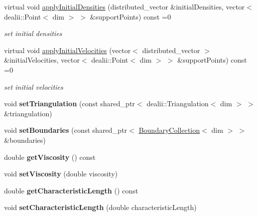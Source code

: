 \begin{DoxyCompactItemize}
\item 
virtual void \hyperlink{classnatrium_1_1ProblemDescription_ab4ccefafd2888510038259445076fed6}{apply\-Initial\-Densities} (distributed\-\_\-vector \&initial\-Densities, vector$<$ dealii\-::\-Point$<$ dim $>$ $>$ \&support\-Points) const =0
\begin{DoxyCompactList}\small\item\em set initial densities \end{DoxyCompactList}\item 
virtual void \hyperlink{classnatrium_1_1ProblemDescription_a28306325c69e7d2086a3dd7f8c514b21}{apply\-Initial\-Velocities} (vector$<$ distributed\-\_\-vector $>$ \&initial\-Velocities, vector$<$ dealii\-::\-Point$<$ dim $>$ $>$ \&support\-Points) const =0
\begin{DoxyCompactList}\small\item\em set initial velocities \end{DoxyCompactList}\item 
\hypertarget{classnatrium_1_1ProblemDescription_ae588b1e0ce4dd89e2fcfbb0c191b1c41}{void {\bfseries set\-Triangulation} (const shared\-\_\-ptr$<$ dealii\-::\-Triangulation$<$ dim $>$ $>$ \&triangulation)}\label{classnatrium_1_1ProblemDescription_ae588b1e0ce4dd89e2fcfbb0c191b1c41}

\item 
\hypertarget{classnatrium_1_1ProblemDescription_aadca2aac3953fa44bf9ce9cf43dc0417}{void {\bfseries set\-Boundaries} (const shared\-\_\-ptr$<$ \hyperlink{classnatrium_1_1BoundaryCollection}{Boundary\-Collection}$<$ dim $>$ $>$ \&boundaries)}\label{classnatrium_1_1ProblemDescription_aadca2aac3953fa44bf9ce9cf43dc0417}

\item 
\hypertarget{classnatrium_1_1ProblemDescription_a582ecf296837d78a8a00fd598de38de2}{double {\bfseries get\-Viscosity} () const }\label{classnatrium_1_1ProblemDescription_a582ecf296837d78a8a00fd598de38de2}

\item 
\hypertarget{classnatrium_1_1ProblemDescription_ad624cab941ab79af0422e5f7c735e8d8}{void {\bfseries set\-Viscosity} (double viscosity)}\label{classnatrium_1_1ProblemDescription_ad624cab941ab79af0422e5f7c735e8d8}

\item 
\hypertarget{classnatrium_1_1ProblemDescription_ac424dbc36ad2d61d128f3656a8d6952d}{double {\bfseries get\-Characteristic\-Length} () const }\label{classnatrium_1_1ProblemDescription_ac424dbc36ad2d61d128f3656a8d6952d}

\item 
\hypertarget{classnatrium_1_1ProblemDescription_adc48f96c34c6318d911bbc41582c202b}{void {\bfseries set\-Characteristic\-Length} (double characteristic\-Length)}\label{classnatrium_1_1ProblemDescription_adc48f96c34c6318d911bbc41582c202b}

\end{DoxyCompactItemize}


